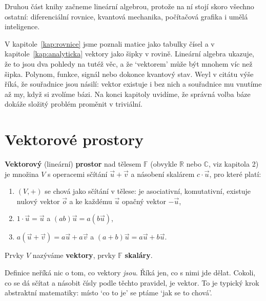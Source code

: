 \label{kap:linearni-algebra}

Druhou část knihy začneme lineární algebrou, protože na ní stojí skoro všechno ostatní: diferenciální rovnice, kvantová mechanika, počítačová grafika i umělá inteligence.

V kapitole~\ref{kap:rovnice} jsme poznali matice jako tabulky čísel a v kapitole~\ref{kap:analyticka} vektory jako šipky v rovině. Lineární algebra ukazuje, že to jsou dva pohledy na tutéž věc, a že `vektorem' může být mnohem víc než šipka. Polynom, funkce, signál nebo dokonce kvantový stav. Weyl v citátu výše říká, že souřadnice jsou násilí: vektor existuje i bez nich a souřadnice mu vnutíme až my, když si zvolíme bázi. Na konci kapitoly uvidíme, že správná volba báze dokáže složitý problém proměnit v triviální.

\section{Vektorové prostory}

\begin{definitionbox}
  \textbf{Vektorový} (lineární) \textbf{prostor} nad tělesem $\mathbb{F}$ (obvykle $\mathbb{R}$ nebo $\mathbb{C}$, viz kapitola 2) je množina $V$ s operacemi sčítání $\vec{u} + \vec{v}$ a násobení skalárem $c\cdot\vec{u}$, pro které platí:
  \begin{enumerate}
    \item $(V, +)$ se chová jako sčítání v tělese: je asociativní, komutativní, existuje nulový vektor $\vec{o}$ a ke každému $\vec{u}$ opačný vektor $-\vec{u}$,
    \item $1\cdot\vec{u} = \vec{u}$ a $(ab)\vec{u} = a(b\vec{u})$,
    \item $a(\vec{u} + \vec{v}) = a\vec{u} + a\vec{v}$ a $(a + b)\vec{u} = a\vec{u} + b\vec{u}$.
  \end{enumerate}
  Prvky $V$ nazýváme \textbf{vektory}, prvky $\mathbb{F}$ \textbf{skaláry}.
\end{definitionbox}

Definice neříká nic o tom, co vektory \textit{jsou}. Říká jen, co s nimi jde dělat. Cokoli, co se dá sčítat a násobit čísly podle těchto pravidel, je vektor. To je typický krok abstraktní matematiky: místo `co to je' se ptáme `jak se to chová'.

